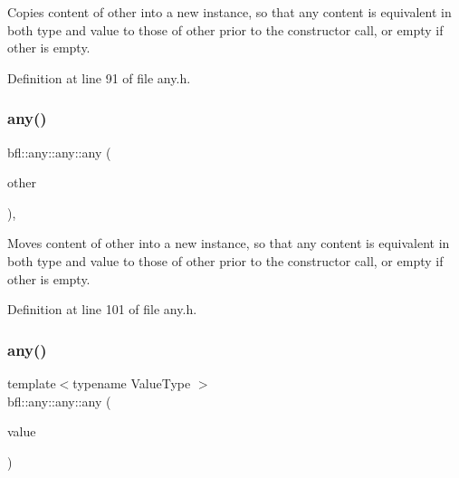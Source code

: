 Copies content of other into a new instance, so that any content is equivalent in both type and value to those of other prior to the constructor call, or empty if other is empty. 



Definition at line 91 of file any.\+h.

\mbox{\label{classbfl_1_1any_1_1any_ab3caf90d0d0e9a57a9cacc690fa57bf5}} 
\subsubsection{\texorpdfstring{any()}{any()}\hspace{0.1cm}{\footnotesize\ttfamily [3/5]}}
{\footnotesize\ttfamily bfl\+::any\+::any\+::any (\begin{DoxyParamCaption}\item[{\mbox{\hyperlink{classbfl_1_1any_1_1any}{any}} \&\&}]{other }\end{DoxyParamCaption})\hspace{0.3cm}{\ttfamily [inline]}, {\ttfamily [noexcept]}}



Moves content of other into a new instance, so that any content is equivalent in both type and value to those of other prior to the constructor call, or empty if other is empty. 



Definition at line 101 of file any.\+h.

\mbox{\label{classbfl_1_1any_1_1any_a71949c13d541881e9e61de1064710616}} 
\subsubsection{\texorpdfstring{any()}{any()}\hspace{0.1cm}{\footnotesize\ttfamily [4/5]}}
{\footnotesize\ttfamily template$<$typename Value\+Type $>$ \\
bfl\+::any\+::any\+::any (\begin{DoxyParamCaption}\item[{const Value\+Type \&}]{value }\end{DoxyParamCaption})\hspace{0.3cm}{\ttfamily [inline]}}



